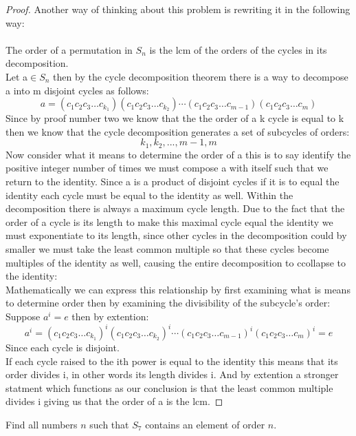 \documentclass[11pt]{article}
\theoremstyle{definition}  %
\newcommand{\block}[2]{\begin{tcolorbox}[title={#1}]{#2}\end{tcolorbox}}
\begin{document}
\begin{proof}
Another way of thinking about this problem is rewriting it in the following way: \\\\
The order of a permutation in $S_n$ is the lcm of the orders of the cycles in its decomposition. \\
Let a$\in S_n$ then by the cycle decomposition theorem there is a way to decompose a into m disjoint cycles as follows:
\[
  a=(c_1 c_2 c_3\dots c_{k_1})(c_1 c_2 c_3\dots c_{k_2})\cdots(c_1 c_2 c_3\dots c_{m-1})(c_1 c_2 c_3\dots c_{m})
\]
Since by proof number two we know that the the order of a k cycle is equal to k then we know that the cycle decomposition generates a set of subcycles of orders:
\[
  {k_1,k_2,...,m-1,m}
\]
Now consider what it means to determine the order of a this is to say identify the positive integer number of times we must compose a with itself such that we return to the identity. Since a is a product of disjoint cycles if it is to equal the identity each cycle must be equal to the identity as well. Within the decomposition there is always a maximum cycle length. Due to the fact that the order of a cycle is its length to make this maximal cycle equal the identity we must exponentiate to its length, since other cycles in the decomposition could by smaller we must take the least common multiple so that these cycles become multiples of the identity as well, causing the entire decomposition to  ccollapse to the identity:
\\
Mathematically we can express this relationship by first examining what is means to determine order then by examining the divisibility of the subcycle's order:
\\
Suppose $a^i=e$ then by extention:
\[
  a^i=(c_1 c_2 c_3\dots c_{k_1})^i(c_1 c_2 c_3\dots c_{k_2})^i\cdots(c_1 c_2 c_3\dots c_{m-1})^i(c_1 c_2 c_3\dots c_{m})^i=e
\]
Since each cycle is disjoint.\\
If each cycle raised to the ith power is equal to the identity this means that its order divides i, in other words its length divides i. And by extention a stronger statment which functions as our conclusion is that the least common multiple divides i giving us that the order of a is the lcm.
\end{proof}
\block{Question #4}{
Find all numbers $n$ such that $S_7$ contains an element of order $n$.
}
\end{document}

